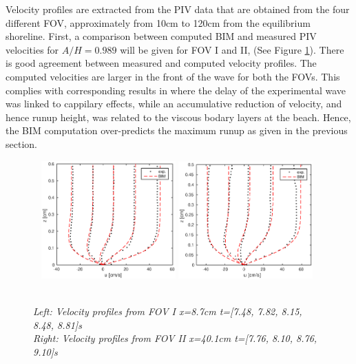 \documentclass[a4paper, 11pt, english, twoside, openright]{article}
\begin{document}
Velocity profiles are extracted from the PIV data that are obtained from the four different FOV, approximately from 10cm to 120cm from the equilibrium shoreline. 
First, a comparison between computed BIM and measured PIV velocities for $A/H=0.989$ will be given for FOV I and II, (See Figure \ref{fig:BIM3_tim}). There is good agreement between measured and computed  velocity profiles. The computed velocities are larger in the front of the wave for both the FOVs. This complies with corresponding results in  \cite{pedersen2013runup} where the
delay of the experimental wave was linked to cappilary effects, while
an accumulative reduction of velocity, and hence runup height, was
related to the viscous bodary layers at the beach.  Hence, the BIM 
computation over-predicts the maximum runup as given in the previous section.

\begin{figure}
        \centering
        ~ %
                \includegraphics[width=0.46\textwidth]{./Figures/BIM/case10_FOV3_PIV_BIM.eps}
                \includegraphics[width=0.46\textwidth]{./Figures/BIM/case10_FOV4_BIM_PIV.eps}
                \caption{\textit{\\ Left: Velocity profiles from FOV I x=8.7cm t=[7.48, 7.82, 8.15, 8.48, 8.81]s\\
                 \quad Right:  Velocity profiles from FOV II x=40.1cm t=[7.76, 8.10, 8.76, 9.10]s}}
              \label{fig:BIM3_tim}
      \end{figure}
\end{document}
